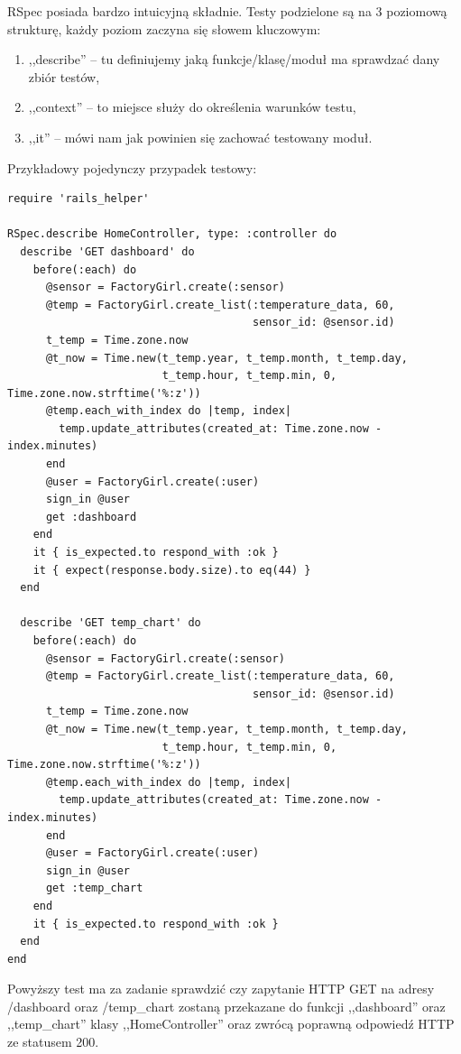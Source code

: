 \documentclass[eng,oneside]{mgr}
\begin{document}
RSpec posiada bardzo intuicyjną składnie. Testy podzielone są na 3 poziomową strukturę, każdy poziom zaczyna się słowem kluczowym:
\begin{enumerate}
  \item ,,describe'' – tu definiujemy jaką funkcje/klasę/moduł ma sprawdzać dany zbiór testów,
  \item ,,context'' – to miejsce służy do określenia warunków testu,
  \item ,,it'' – mówi nam jak powinien się zachować testowany moduł.
\end{enumerate}

Przykładowy pojedynczy przypadek testowy:
\begin{lstlisting}[caption={Test kontrolera HomeController.}]
require 'rails_helper'

RSpec.describe HomeController, type: :controller do
  describe 'GET dashboard' do
    before(:each) do
      @sensor = FactoryGirl.create(:sensor)
      @temp = FactoryGirl.create_list(:temperature_data, 60,
                                      sensor_id: @sensor.id)
      t_temp = Time.zone.now
      @t_now = Time.new(t_temp.year, t_temp.month, t_temp.day,
                        t_temp.hour, t_temp.min, 0, Time.zone.now.strftime('%:z'))
      @temp.each_with_index do |temp, index|
        temp.update_attributes(created_at: Time.zone.now - index.minutes)
      end
      @user = FactoryGirl.create(:user)
      sign_in @user
      get :dashboard
    end
    it { is_expected.to respond_with :ok }
    it { expect(response.body.size).to eq(44) }
  end

  describe 'GET temp_chart' do
    before(:each) do
      @sensor = FactoryGirl.create(:sensor)
      @temp = FactoryGirl.create_list(:temperature_data, 60,
                                      sensor_id: @sensor.id)
      t_temp = Time.zone.now
      @t_now = Time.new(t_temp.year, t_temp.month, t_temp.day,
                        t_temp.hour, t_temp.min, 0, Time.zone.now.strftime('%:z'))
      @temp.each_with_index do |temp, index|
        temp.update_attributes(created_at: Time.zone.now - index.minutes)
      end
      @user = FactoryGirl.create(:user)
      sign_in @user
      get :temp_chart
    end
    it { is_expected.to respond_with :ok }
  end
end  
\end{lstlisting}

Powyższy test ma za zadanie sprawdzić czy zapytanie HTTP GET na adresy /dashboard oraz /temp\_chart zostaną przekazane do funkcji ,,dashboard'' oraz ,,temp\_chart'' klasy ,,HomeController'' oraz zwrócą poprawną odpowiedź HTTP ze statusem 200.
\end{document}
